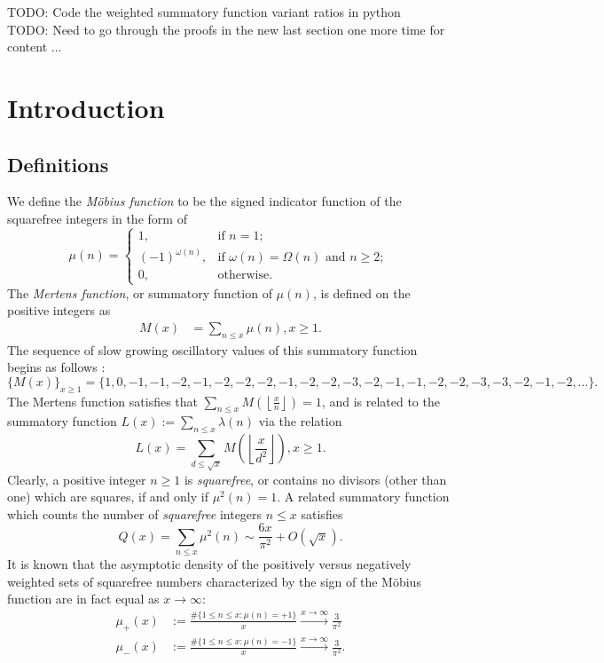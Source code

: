 \documentclass[11pt,reqno,a4letter]{article}
\numberwithin{figure}{section}
\numberwithin{table}{section}
\newcommand{\seqnum}[1]{\href{http://oeis.org/#1}{\color{ProcessBlue}{\underline{#1}}}}
\newcommand{\Floor}[2]{\ensuremath{\left\lfloor \frac{#1}{#2} \right\rfloor}}
\theoremstyle{plain}
\numberwithin{theorem}{section}
\theoremstyle{definition}
\begin{document}
TODO: Code the weighted summatory function variant ratios in python \\ 
TODO: Need to go through the proofs in the new last section one more 
      time for content ... \\ 

\newpage
\section{Introduction} 
\label{subSection_MertensMxClassical_Intro} 

\subsection{Definitions} 

We define the \emph{M\"obius function} to be the signed indicator function 
of the squarefree integers in the form of \cite[\seqnum{A008683}]{OEIS} 
\[
\mu(n) = \begin{cases} 
     1, & \text{if $n = 1$; } \\ 
     (-1)^{\omega(n)}, & \text{if $\omega(n) = \Omega(n)$ and $n \geq 2$; } \\ 
     0, & \text{otherwise.} 
     \end{cases} 
\]
The \emph{Mertens function}, or summatory function of $\mu(n)$, is defined on the 
positive integers as 
\begin{align*} 
M(x) & = \sum_{n \leq x} \mu(n), x \geq 1. 
\end{align*} 
The sequence of slow growing oscillatory values of this 
summatory function begins as follows \cite[\seqnum{A002321}]{OEIS}: 
\[
\{M(x)\}_{x \geq 1} = \{1, 0, -1, -1, -2, -1, -2, -2, -2, -1, -2, -2, -3, -2, 
     -1, -1, -2, -2, -3, -3, -2, -1, -2, \ldots\}. 
\] 
The Mertens function satisfies that $\sum_{n \leq x} M\left(\Floor{x}{n}\right) = 1$, and is related 
to the summatory function $L(x) := \sum_{n \leq x} \lambda(n)$ via the relation 
\cite{HUMPHRIES-JNT-2013,LEHMAN-1960} 
\[
L(x) = \sum_{d \leq \sqrt{x}} M\left(\Floor{x}{d^2}\right), x \geq 1. 
\]
Clearly, a positive integer $n \geq 1$ is \emph{squarefree}, or contains no divisors (other than one) which are 
squares, if and only if $\mu^2(n) = 1$. 
A related summatory function which counts the 
number of \emph{squarefree} integers $n \leq x$ satisfies 
\cite[\S 18.6]{HARDYWRIGHT} \cite[\seqnum{A013928}]{OEIS} 
\[ 
Q(x) = \sum_{n \leq x} \mu^2(n) \sim \frac{6x}{\pi^2} + O\left(\sqrt{x}\right). 
\] 
It is known that the asymptotic density of the positively versus negatively 
weighted sets of squarefree numbers characterized by the sign of the 
M\"obius function are in fact equal as $x \rightarrow \infty$: 
\begin{align*}
\mu_{+}(x) & := \frac{\#\{1 \leq n \leq x: \mu(n) = +1\}}{x} 
     \xrightarrow{x \rightarrow \infty} \frac{3}{\pi^2} \\ 
\mu_{-}(x) & := \frac{\#\{1 \leq n \leq x: \mu(n) = -1\}}{x} 
     \xrightarrow{x \rightarrow \infty} \frac{3}{\pi^2}. 
\end{align*}
\end{document}
